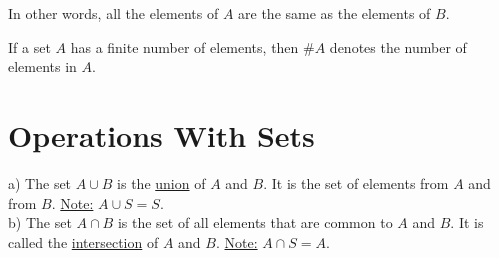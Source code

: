 In other words, all the elements of $A$ are the same as the elements of $B$.

\begin{definition}
If a set $A$ has a finite number of elements, then $\#A$ denotes the number of elements in $A$. 
\end{definition}

\section{Operations With Sets}

\begin{definition}
a) The set $A \cup B$ is the \underline{union} of $A$ and $B$. It is the set of elements from $A$ and from $B$. \underline{Note:} $A \cup S = S$. \\
b) The set $A \cap B$ is the set of all elements that are common to $A$ and $B$. It is called the \underline{intersection} of $A$ and $B$. \underline{Note:} $A \cap S = A$.
\end{definition}

